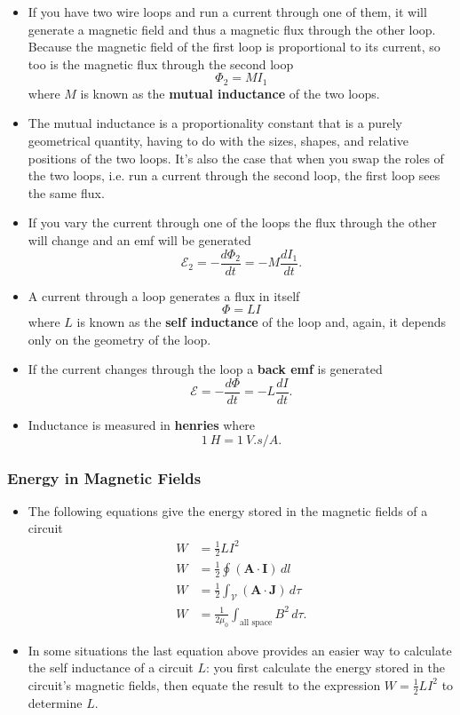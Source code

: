 \documentclass{article}
\renewcommand{\vec}[1]{\boldsymbol{\mathbf{#1}}}
\begin{document}
\begin{itemize}
  \item If you have two wire loops and run a current through one of them, it will generate a magnetic field and thus a magnetic flux through the other loop. Because the magnetic field of the first loop is proportional to its current, so too is the magnetic flux through the second loop \[\Phi_2 = M I_1\] where $M$ is known as the \textbf{mutual inductance} of the two loops.

  \item The mutual inductance is a proportionality constant that is a purely geometrical quantity, having to do with the sizes, shapes, and relative positions of the two loops. It's also the case that when you swap the roles of the two loops, i.e. run a current through the second loop, the first loop sees the same flux.

  \item If you vary the current through one of the loops the flux through the other will change and an emf will be generated \[\mathcal{E}_2 = -\frac{d \Phi_2}{d t} = -M \frac{d I_1}{d t}.\]

  \item A current through a loop generates a flux in itself \[\Phi = L I\] where $L$ is known as the \textbf{self inductance} of the loop and, again, it depends only on the geometry of the loop.

  \item If the current changes through the loop a \textbf{back emf} is generated \[\mathcal{E} = -\frac{d \Phi}{d t} = -L \frac{d I}{d t}.\]

  \item Inductance is measured in \textbf{henries} where \[\qty{1}{H} = \qty{1}{V.s/A}.\]
\end{itemize}

\subsubsection{Energy in Magnetic Fields}

\begin{itemize}
  \item The following equations give the energy stored in the magnetic fields of a circuit \begin{align*}
          W & = \frac{1}{2} L I^2                                             \\
          W & = \frac{1}{2} \oint (\vec{A} \cdot \vec{I}) \,d l               \\
          W & = \frac{1}{2} \int_\mathcal{V} (\vec{A} \cdot \vec{J}) \,d \tau \\
          W & = \frac{1}{2 \mu_0} \int_\text{all space} B^2 \,d \tau.
        \end{align*}

  \item In some situations the last equation above provides an easier way to calculate the self inductance of a circuit $L$: you first calculate the energy stored in the circuit's magnetic fields, then equate the result to the expression $W = \frac{1}{2} L I^2$ to determine $L$.
\end{itemize}
\end{document}
